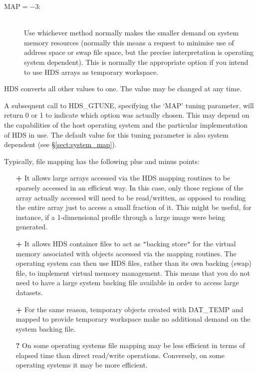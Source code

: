 \documentclass[11pt]{article}
\newcommand{\htmlref}[2]{#1}
\newcommand{\qt}[1]{``#1''}
\newcommand{\mplus}[0]{{$+$}}
\renewcommand{\qt}[1]{{\tt{"}}#1{\tt{"}}}
\renewcommand{\mplus}[0]{+}
\begin{document}
\begin{description}
\begin{description}
\item[MAP$=-$3:]\mbox{}\\
Use whichever method normally makes the smaller demand on system
memory resources (normally this means a request to minimise use of
address space or swap file space, but the precise interpretation is
operating system dependent). This is normally the appropriate option
if you intend to use HDS arrays as temporary workspace.

\end{description}

HDS converts all other values to one. The value may be changed at any
time.

A subsequent call to \htmlref{HDS\_GTUNE}{HDS_GTUNE}, specifying the
`MAP' tuning parameter, will return 0 or 1 to indicate which option
was actually chosen. This may depend on the capabilities of the host
operating system and the particular implementation of HDS in use. The
default value for this tuning parameter is also system dependent (see
\S\ref{sect:system_map}).

Typically, file mapping has the following plus and minus points:

\begin{itemize}

\item[{\bf \mplus}] It allows large arrays accessed via the HDS mapping
routines to be sparsely accessed in an efficient way. In this case,
only those regions of the array actually accessed will need to be
read/written, as opposed to reading the entire array just to access a
small fraction of it. This might be useful, for instance, if a
1-dimensional profile through a large image were being generated.

\item[{\bf \mplus}] It allows HDS container files to act as \qt{backing store}
for the virtual memory associated with objects accessed via the
mapping routines. The operating system can then use HDS files, rather
than its own backing (swap) file, to implement virtual memory
management. This means that you do not need to have a large system
backing file available in order to access large datasets.

\item[{\bf \mplus}] For the same reason, temporary objects created with
\htmlref{DAT\_TEMP}{DAT_TEMP} and mapped to provide temporary
workspace make no additional demand on the system backing file.

\item[{\bf ?}] On some operating systems file mapping may be less
efficient in terms of elapsed time than direct read/write
operations. Conversely, on some operating systems it may be more
efficient.


\end{itemize}
\end{description}
\end{document}

